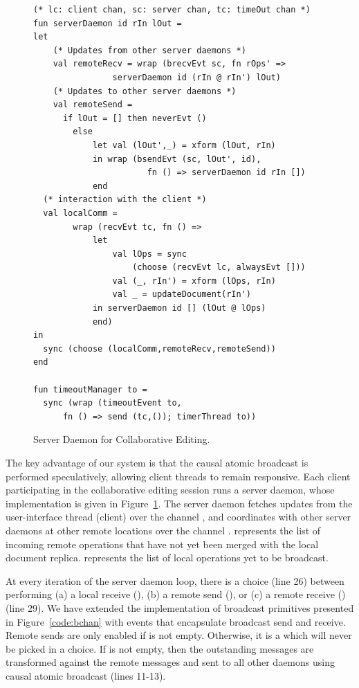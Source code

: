 \begin{figure}[t]
\begin{lstlisting}
(* lc: client chan, sc: server chan, tc: timeOut chan *)
fun serverDaemon id rIn lOut =
let
	(* Updates from other server daemons *)
	val remoteRecv = wrap (brecvEvt sc, fn rOps' =>
				serverDaemon id (rIn @ rIn') lOut)
	(* Updates to other server daemons *)
	val remoteSend =
	  if lOut = [] then neverEvt ()
		else
			let val (lOut',_) = xform (lOut, rIn)
			in wrap (bsendEvt (sc, lOut', id),
  					   fn () => serverDaemon id rIn [])
			end
  (* interaction with the client *)
  val localComm =
		wrap (recvEvt tc, fn () =>
			let
				val lOps = sync
				  	(choose (recvEvt lc, alwaysEvt []))
				val (_, rIn') = xform (lOps, rIn)
				val _ = updateDocument(rIn')
			in serverDaemon id [] (lOut @ lOps)
			end)
in
  sync (choose (localComm,remoteRecv,remoteSend))
end

fun timeoutManager to =
  sync (wrap (timeoutEvent to,
	  fn () => send (tc,()); timerThread to))
\end{lstlisting}
\caption{Server Daemon for Collaborative Editing.}
\label{code:serverDaemon}
\end{figure}

The key advantage of our system is that the causal atomic broadcast is
performed speculatively, allowing client threads to remain responsive. Each
client participating in the collaborative editing session runs a server daemon,
whose implementation is given in Figure~\ref{code:serverDaemon}. The server
daemon fetches updates from the user-interface thread (client) over the channel
, and coordinates with other server daemons at other remote locations
over the channel .   represents the list of incoming remote
operations that have not yet been merged with the local document replica.
 represents the list of local operations yet to be broadcast.

At every iteration of the server daemon loop, there is a choice (line 26) between
performing (a) a local receive (), (b) a remote send
(), or (c) a remote receive () (line 29). We
have extended the implementation of broadcast primitives presented in
Figure~\ref{code:bchan} with events that encapsulate broadcast send and
receive. Remote sends are only enabled if  is not empty. Otherwise,
it is a  which will never be picked in a choice. If
 is not empty, then the outstanding messages are transformed
against the remote messages and sent to all other daemons using causal atomic
broadcast (lines 11-13).

